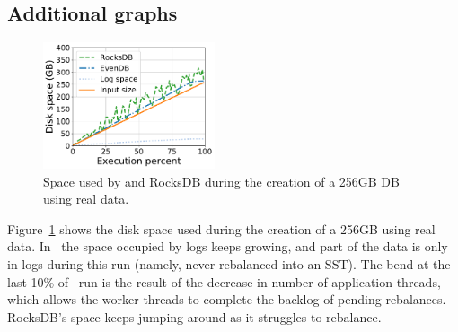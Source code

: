
\subsection{Additional graphs}
\begin{figure}[t]
	\centering
	\includegraphics[width=0.45\textwidth]{figs/space_timeline_real_line.pdf}
	\caption{{Space used by \sys\/ and RocksDB during the creation of a 256GB DB using real data.}}
	\label{fig:space_timeline}
\end{figure}

Figure~\ref{fig:space_timeline} shows the disk space used during the creation of a 256GB using real data. In \sys\, the space occupied by logs keeps growing, and part of the data is only in logs during this run (namely, never rebalanced into an SST). The bend at the last 10\% of \sys\ run is the result of the decrease in number of application threads, which allows the worker threads to complete the backlog of pending rebalances. RocksDB's space keeps jumping around as it struggles to rebalance.

